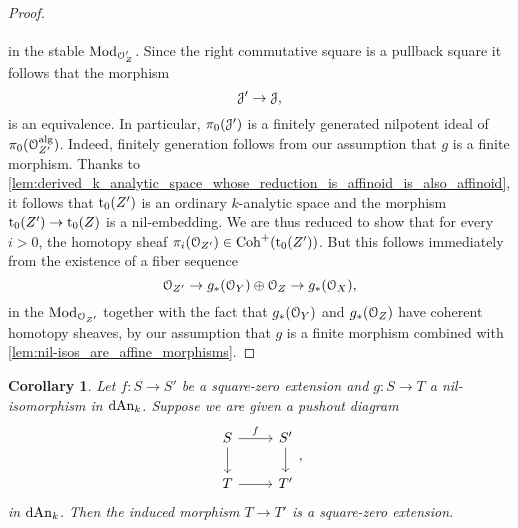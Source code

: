 \documentclass[10pt,a4paper,reqno]{amsart} %
\theoremstyle{plain}
\newtheorem{cor}[thm]{Corollary}
\theoremstyle{definition}
\theoremstyle{remark}
\numberwithin{equation}{section}
\begin{document}
\begin{proof}
\[\begin{tikzcd}
        \end{tikzcd}
        \]
    in the stable \infcat $\mathrm{Mod}_{\mathcal O_Z'}$. Since the right commutative square is a pullback square it follows that the morphism
        \[
            \mathcal J' \to \mathcal J,  
        \]
    is an equivalence. In particular, $\pi_0(\mathcal J')$ is a finitely generated
    nilpotent ideal of $\pi_0(\mathcal O^\mathrm{alg}_{Z'})$. Indeed, finitely generation follows from our assumption that $g$ is a finite morphism.
    Thanks to \cref{lem:derived_k_analytic_space_whose_reduction_is_affinoid_is_also_affinoid},
    it follows that $\mathrm{t}_0(Z')$ is an ordinary $k$-analytic space and the morphism $\mathrm{t}_0(Z') \to \mathrm{t}_0(Z)$ is a nil-embedding. We are thus reduced to show that
    for every $i>0$, the homotopy sheaf $\pi_i(\mathcal O_{Z'}) \in \mathrm{Coh}^+(\mathrm{t}_0(Z'))$. But this follows immediately from the existence of a fiber sequence
        \[
            \mathcal O_{Z'} \to g_*(\mathcal O_Y) \oplus \mathcal O_Z \to g_*(\mathcal O_X),  
        \]
    in the \infcat $\mathrm{Mod}_{\mathcal O_{Z'}}$ together with the fact that $g_*(\mathcal O_Y)$ and $g_*(\mathcal O_Z)$ have coherent homotopy sheaves, by our assumption that $g$ is a
    finite morphism combined with \cref{lem:nil-isos_are_affine_morphisms}.
\end{proof}

\begin{cor} \label{lem:pushouts_of_square_zero_extensions_have_the_structure_of_a_square_zero_extension}
    Let $f \colon S \to S'$ be a square-zero extension and $g \colon S \to T$ a nil-isomorphism in $\mathrm{dAn}_k$. Suppose we are given a pushout diagram
        \[
        \begin{tikzcd}
            S \ar{r}{f} \ar{d} & S' \ar{d} \\
            T \ar{r} & T'  
        \end{tikzcd},
        \]
    in $\mathrm{dAn}_k$. Then the induced morphism $T \to T'$ is a square-zero extension.
\end{cor}
\end{document}
